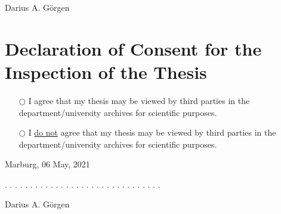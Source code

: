 \documentclass[a4paper,11pt]{article}
\newcommand{\thesisauthor}{Darius A. Görgen}
\newcommand{\thesisdate}{06 May, 2021}
\begin{document}
\thesisauthor{}
\vspace{2.5cm}

\hypertarget{declaration-of-consent}{%
\section*{Declaration of Consent for the Inspection of the Thesis}\label{declaration-of-consent}}
\begin{itemize}
\item[$\bigcirc$]{I agree that my thesis may be viewed by third parties in the department/university archives for scientific purposes.}
\item[$\bigcirc$]{I \underline{do not} agree that my thesis may be viewed by third parties in the department/university archives for scientific purposes.}
\end{itemize}
\vspace{1cm}

Marburg, \thesisdate{}
\vspace{1.5cm}

. . . . . . . . . . . . . . . . . . . . . . . . . . . . . . .
\vspace{0.1cm}

\thesisauthor{}
\end{document}
